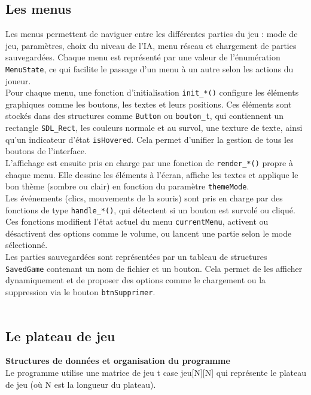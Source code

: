 \documentclass[12pt, a4paper, oneside]{article}
\begin{document}
        \subsection{Les menus}
                Les menus permettent de naviguer entre les différentes parties du jeu : mode de jeu, paramètres, choix du niveau de l’IA, menu réseau et chargement de parties sauvegardées. Chaque menu est représenté par une valeur de l’énumération \texttt{MenuState}, ce qui facilite le passage d’un menu à un autre selon les actions du joueur. \\
        
        Pour chaque menu, une fonction d’initialisation \texttt{init\_*()} configure les éléments graphiques comme les boutons, les textes et leurs positions. Ces éléments sont stockés dans des structures comme \texttt{Button} ou \texttt{bouton\_t}, qui contiennent un rectangle \texttt{SDL\_Rect}, les couleurs normale et au survol, une texture de texte, ainsi qu’un indicateur d’état \texttt{isHovered}. Cela permet d’unifier la gestion de tous les boutons de l’interface. \\
        
        L’affichage est ensuite pris en charge par une fonction de \texttt{render\_*()} propre à chaque menu. Elle dessine les éléments à l’écran, affiche les textes et applique le bon thème (sombre ou clair) en fonction du paramètre \texttt{themeMode}. \\
        
        Les événements (clics, mouvements de la souris) sont pris en charge par des fonctions de type \texttt{handle\_*()}, qui détectent si un bouton est survolé ou cliqué. Ces fonctions modifient l’état actuel du menu \texttt{currentMenu}, activent ou désactivent des options comme le volume, ou lancent une partie selon le mode sélectionné. \\
        
        Les parties sauvegardées sont représentées par un tableau de structures \texttt{SavedGame} contenant un nom de fichier et un bouton. Cela permet de les afficher dynamiquement et de proposer des options comme le chargement ou la suppression via le bouton \texttt{btnSupprimer}. \\
 \\

        \subsection{Le plateau de jeu}
        \textbf{Structures de données et organisation du programme} \\
            Le programme utilise une matrice de jeu t\textunderscore
            case jeu[N][N] qui représente le plateau de jeu (où N est la longueur du plateau). \\
\end{document}
